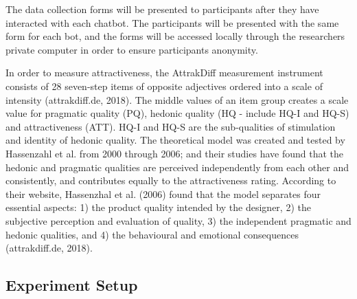    The data collection forms will be presented to participants after they have interacted with each chatbot. The participants will be presented with the same form for each bot, and the forms will be accessed locally through the researchers private computer in order to ensure participants anonymity. 
    
    In order to measure attractiveness, the AttrakDiff measurement instrument consists of 28 seven-step items of opposite adjectives ordered into a scale of intensity (attrakdiff.de, 2018). The middle values of an item group creates a scale value for pragmatic quality (PQ), hedonic quality (HQ - include HQ-I and HQ-S) and attractiveness (ATT). HQ-I and HQ-S are the sub-qualities of stimulation and identity of hedonic quality. The theoretical model was created and tested by Hassenzahl et al. from 2000 through 2006; and their studies have found that the hedonic and pragmatic qualities are perceived independently from each other and consistently, and contributes equally to the attractiveness rating. According to their website, Hassenzhal et al. (2006) found that the model separates four essential aspects: 1) the product quality intended by the designer, 2) the subjective perception and evaluation of quality, 3) the independent pragmatic and hedonic qualities, and 4) the behavioural and emotional consequences (attrakdiff.de, 2018).

    \subsection{Experiment Setup}
    
